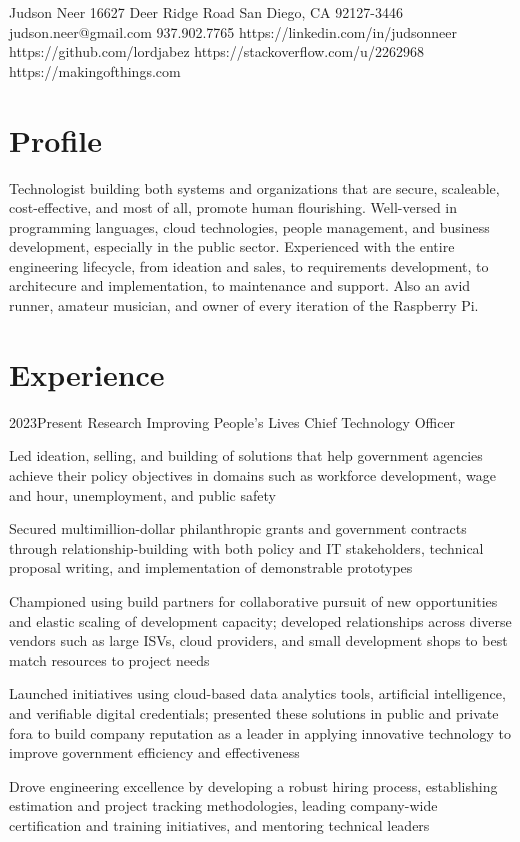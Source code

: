 \documentclass{article}
\begin{document}
\header
  {Judson Neer}
  {16627 Deer Ridge Road}
  {San Diego, CA 92127-3446}
  {judson.neer@gmail.com}
  {937.902.7765}
  {https://linkedin.com/in/judsonneer}
  {https://github.com/lordjabez}
  {https://stackoverflow.com/u/2262968}
  {https://makingofthings.com}


\section{Profile}

Technologist building both systems and organizations that are secure, scaleable, cost-effective, and most of all, promote human flourishing. Well-versed in programming languages, cloud technologies, people management, and business development, especially in the public sector. Experienced with the entire engineering lifecycle, from ideation and sales, to requirements development, to architecure and implementation, to maintenance and support. Also an avid runner, amateur musician, and owner of every iteration of the Raspberry Pi.


\section{Experience}

\job
  {2023}{Present}
  {Research Improving People's Lives}
  {Chief Technology Officer}
  {\begin{achievements}
    \item Led ideation, selling, and building of solutions that help government agencies achieve their policy objectives in domains such as workforce development, wage and hour, unemployment, and public safety
    \item Secured multimillion-dollar philanthropic grants and government contracts through relationship-building with both policy and IT stakeholders, technical proposal writing, and implementation of demonstrable prototypes
    \item Championed using build partners for collaborative pursuit of new opportunities and elastic scaling of development capacity; developed relationships across diverse vendors such as large ISVs, cloud providers, and small development shops to best match resources to project needs
    \item Launched initiatives using cloud-based data analytics tools, artificial intelligence, and verifiable digital credentials; presented these solutions in public and private fora to build company reputation as a leader in applying innovative technology to improve government efficiency and effectiveness
    \item Drove engineering excellence by developing a robust hiring process, establishing estimation and project tracking methodologies, leading company-wide certification and training initiatives, and mentoring technical leaders
  \end{achievements}}
\end{document}
